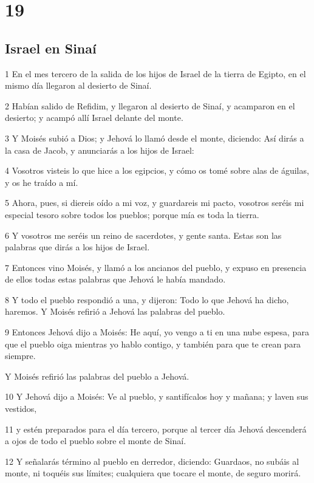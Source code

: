 \chapter{19}

\section*{Israel en Sinaí}

\par 1 En el mes tercero de la salida de los hijos de Israel de la tierra de Egipto, en el mismo día llegaron al desierto de Sinaí.
\par 2 Habían salido de Refidim, y llegaron al desierto de Sinaí, y acamparon en el desierto; y acampó allí Israel delante del monte.
\par 3 Y Moisés subió a Dios; y Jehová lo llamó desde el monte, diciendo: Así dirás a la casa de Jacob, y anunciarás a los hijos de Israel:
\par 4 Vosotros visteis lo que hice a los egipcios, y cómo os tomé sobre alas de águilas, y os he traído a mí.
\par 5 Ahora, pues, si diereis oído a mi voz, y guardareis mi pacto, vosotros seréis mi especial tesoro sobre todos los pueblos; porque mía es toda la tierra.
\par 6 Y vosotros me seréis un reino de sacerdotes, y gente santa. Estas son las palabras que dirás a los hijos de Israel.
\par 7 Entonces vino Moisés, y llamó a los ancianos del pueblo, y expuso en presencia de ellos todas estas palabras que Jehová le había mandado.
\par 8 Y todo el pueblo respondió a una, y dijeron: Todo lo que Jehová ha dicho, haremos. Y Moisés refirió a Jehová las palabras del pueblo.
\par 9 Entonces Jehová dijo a Moisés: He aquí, yo vengo a ti en una nube espesa, para que el pueblo oiga mientras yo hablo contigo, y también para que te crean para siempre.
\par Y Moisés refirió las palabras del pueblo a Jehová.
\par 10 Y Jehová dijo a Moisés: Ve al pueblo, y santifícalos hoy y mañana; y laven sus vestidos,
\par 11 y estén preparados para el día tercero, porque al tercer día Jehová descenderá a ojos de todo el pueblo sobre el monte de Sinaí.
\par 12 Y señalarás término al pueblo en derredor, diciendo: Guardaos, no subáis al monte, ni toquéis sus límites; cualquiera que tocare el monte, de seguro morirá.
